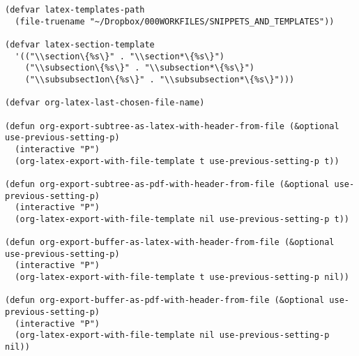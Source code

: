 \documentclass[10pt]{article}
\begin{document}
\begin{verbatim}
(defvar latex-templates-path
  (file-truename "~/Dropbox/000WORKFILES/SNIPPETS_AND_TEMPLATES"))

(defvar latex-section-template
  '(("\\section\{%s\}" . "\\section*\{%s\}")
    ("\\subsection\{%s\}" . "\\subsection*\{%s\}")
    ("\\subsubsect1on\{%s\}" . "\\subsubsection*\{%s\}")))

(defvar org-latex-last-chosen-file-name)

(defun org-export-subtree-as-latex-with-header-from-file (&optional use-previous-setting-p)
  (interactive "P")
  (org-latex-export-with-file-template t use-previous-setting-p t))

(defun org-export-subtree-as-pdf-with-header-from-file (&optional use-previous-setting-p)
  (interactive "P")
  (org-latex-export-with-file-template nil use-previous-setting-p t))

(defun org-export-buffer-as-latex-with-header-from-file (&optional use-previous-setting-p)
  (interactive "P")
  (org-latex-export-with-file-template t use-previous-setting-p nil))

(defun org-export-buffer-as-pdf-with-header-from-file (&optional use-previous-setting-p)
  (interactive "P")
  (org-latex-export-with-file-template nil use-previous-setting-p nil))



\end{verbatim}
\end{document}
